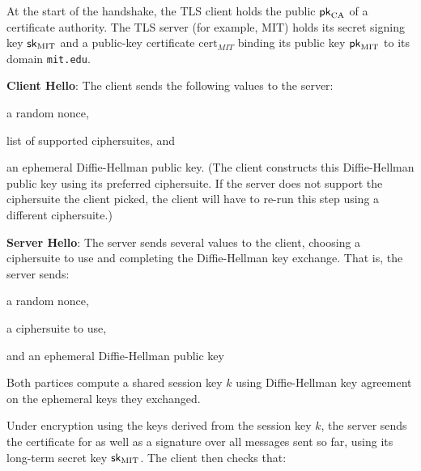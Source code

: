 \begin{compactenum}
\item At the start of the handshake, the TLS client
  holds the public $\mathsf{pk}_{\text{CA}}$ of a certificate authority.
  The TLS server (for example, MIT) holds its secret signing key
  ${\mathsf{sk}}_\text{MIT}$ and a public-key certificate $\text{cert}_{MIT}$
  binding its public key $\mathsf{pk}_\text{MIT}$ to its domain \texttt{mit.edu}.
\item \textbf{Client Hello}: The client sends the following values to
  the server:
	\begin{compactitem}
		\item a random nonce,
		\item list of supported ciphersuites, and
		\item an ephemeral Diffie-Hellman public key.
          (The client constructs this Diffie-Hellman public key
          using its preferred ciphersuite. If the server does not
          support the ciphersuite the client picked, the client
          will have to re-run this step using a different
          ciphersuite.)
	\end{compactitem}
\item \textbf{Server Hello}: The server sends several values to the client, choosing a ciphersuite to use and completing the Diffie-Hellman key exchange. 
  That is, the server sends:
	\begin{compactitem}
		\item a random nonce,
		\item a ciphersuite to use,
		\item and an ephemeral Diffie-Hellman public key
	\end{compactitem}
\item Both partices compute a shared session key $k$
  using Diffie-Hellman key agreement on the ephemeral keys 
  they exchanged.
\item Under encryption using the keys derived from the session key $k$, the server sends the certificate for  as well as a signature over all messages sent so far, using its long-term secret key ${\mathsf{sk}}_\text{MIT}$. The client then checks that:

\end{compactenum}
